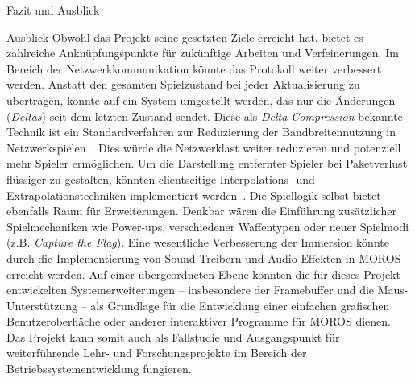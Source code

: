 \begin{section}{Fazit und Ausblick}
\begin{subsection}{Ausblick}
Obwohl das Projekt seine gesetzten Ziele erreicht hat, bietet es zahlreiche Anknüpfungspunkte für zukünftige Arbeiten und Verfeinerungen.
Im Bereich der Netzwerkkommunikation könnte das Protokoll weiter verbessert werden.
Anstatt den gesamten Spielzustand bei jeder Aktualisierung zu übertragen, könnte auf ein System umgestellt werden, das nur die Änderungen (\emph{Deltas}) seit dem letzten Zustand sendet.
Diese als \emph{Delta Compression} bekannte Technik ist ein Standardverfahren zur Reduzierung der Bandbreitennutzung in Netzwerkspielen~\cite{fiedler2010snapshot}.
Dies würde die Netzwerklast weiter reduzieren und potenziell mehr Spieler ermöglichen.
Um die Darstellung entfernter Spieler bei Paketverlust flüssiger zu gestalten, könnten clientseitige Interpolations- und Extrapolationstechniken implementiert werden~\cite{unity_interpolation}.
Die Spiellogik selbst bietet ebenfalls Raum für Erweiterungen.
Denkbar wären die Einführung zusätzlicher Spielmechaniken wie Power-ups, verschiedener Waffentypen oder neuer Spielmodi (z.B. \emph{Capture the Flag}).
Eine wesentliche Verbesserung der Immersion könnte durch die Implementierung von Sound-Treibern und Audio-Effekten in MOROS erreicht werden.
Auf einer übergeordneten Ebene könnten die für dieses Projekt entwickelten Systemerweiterungen – insbesondere der Framebuffer und die Maus-Unterstützung – als Grundlage für die Entwicklung einer einfachen grafischen Benutzeroberfläche oder anderer interaktiver Programme für MOROS dienen.
Das Projekt kann somit auch als Fallstudie und Ausgangspunkt für weiterführende Lehr- und Forschungsprojekte im Bereich der Betriebssystementwicklung fungieren.
\end{subsection}

\end{section}